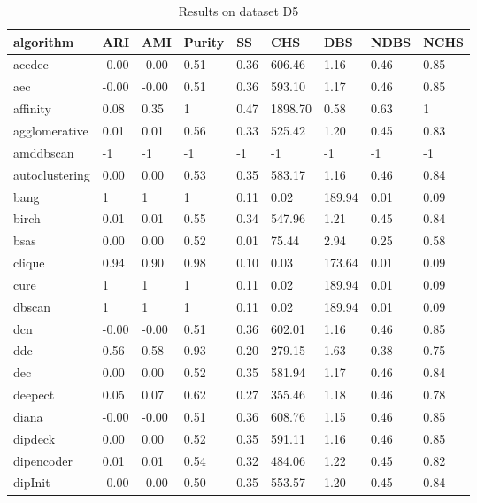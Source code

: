 


\begin{table}[H]
\centering
\caption{Results on dataset D5}
\label{S58_Table}
\begin{tabular}{|l|l|l|l|l|l|l|l|l|}
\hline
algorithm & ARI & AMI & Purity & SS & CHS & DBS & NDBS & NCHS \\
\hline
acedec & -0.00 & -0.00 & 0.51 & 0.36 & 606.46 & 1.16 & 0.46 & 0.85 \\
\hline
aec & -0.00 & -0.00 & 0.51 & 0.36 & 593.10 & 1.17 & 0.46 & 0.85 \\
\hline
affinity & 0.08 & 0.35 & 1 & 0.47 & 1898.70 & 0.58 & 0.63 & 1 \\
\hline
agglomerative & 0.01 & 0.01 & 0.56 & 0.33 & 525.42 & 1.20 & 0.45 & 0.83 \\
\hline
amddbscan & -1 & -1 & -1 & -1 & -1 & -1 & -1 & -1 \\
\hline
autoclustering & 0.00 & 0.00 & 0.53 & 0.35 & 583.17 & 1.16 & 0.46 & 0.84 \\
\hline
bang & 1 & 1 & 1 & 0.11 & 0.02 & 189.94 & 0.01 & 0.09 \\
\hline
birch & 0.01 & 0.01 & 0.55 & 0.34 & 547.96 & 1.21 & 0.45 & 0.84 \\
\hline
bsas & 0.00 & 0.00 & 0.52 & 0.01 & 75.44 & 2.94 & 0.25 & 0.58 \\
\hline
clique & 0.94 & 0.90 & 0.98 & 0.10 & 0.03 & 173.64 & 0.01 & 0.09 \\
\hline
cure & 1 & 1 & 1 & 0.11 & 0.02 & 189.94 & 0.01 & 0.09 \\
\hline
dbscan & 1 & 1 & 1 & 0.11 & 0.02 & 189.94 & 0.01 & 0.09 \\
\hline
dcn & -0.00 & -0.00 & 0.51 & 0.36 & 602.01 & 1.16 & 0.46 & 0.85 \\
\hline
ddc & 0.56 & 0.58 & 0.93 & 0.20 & 279.15 & 1.63 & 0.38 & 0.75 \\
\hline
dec & 0.00 & 0.00 & 0.52 & 0.35 & 581.94 & 1.17 & 0.46 & 0.84 \\
\hline
deepect & 0.05 & 0.07 & 0.62 & 0.27 & 355.46 & 1.18 & 0.46 & 0.78 \\
\hline
diana & -0.00 & -0.00 & 0.51 & 0.36 & 608.76 & 1.15 & 0.46 & 0.85 \\
\hline
dipdeck & 0.00 & 0.00 & 0.52 & 0.35 & 591.11 & 1.16 & 0.46 & 0.85 \\
\hline
dipencoder & 0.01 & 0.01 & 0.54 & 0.32 & 484.06 & 1.22 & 0.45 & 0.82 \\
\hline
dipInit & -0.00 & -0.00 & 0.50 & 0.35 & 553.57 & 1.20 & 0.45 & 0.84 \\

\end{tabular}
\end{table}
